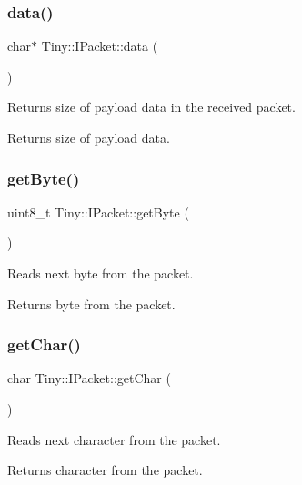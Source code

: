 \subsubsection{\texorpdfstring{data()}{data()}}
{\footnotesize\ttfamily char$\ast$ Tiny\+::\+I\+Packet\+::data (\begin{DoxyParamCaption}{ }\end{DoxyParamCaption})\hspace{0.3cm}{\ttfamily [inline]}}

Returns size of payload data in the received packet. \begin{DoxyReturn}{Returns}
size of payload data. 
\end{DoxyReturn}
\mbox{\label{classTiny_1_1IPacket_ac3088a86a37df4d08d0f6ca961abf006}} 
\subsubsection{\texorpdfstring{get\+Byte()}{getByte()}}
{\footnotesize\ttfamily uint8\+\_\+t Tiny\+::\+I\+Packet\+::get\+Byte (\begin{DoxyParamCaption}{ }\end{DoxyParamCaption})\hspace{0.3cm}{\ttfamily [inline]}}

Reads next byte from the packet. \begin{DoxyReturn}{Returns}
byte from the packet. 
\end{DoxyReturn}
\mbox{\label{classTiny_1_1IPacket_a0fea05a806c533be32c68bb3899bd596}} 
\subsubsection{\texorpdfstring{get\+Char()}{getChar()}}
{\footnotesize\ttfamily char Tiny\+::\+I\+Packet\+::get\+Char (\begin{DoxyParamCaption}{ }\end{DoxyParamCaption})\hspace{0.3cm}{\ttfamily [inline]}}

Reads next character from the packet. \begin{DoxyReturn}{Returns}
character from the packet. 
\end{DoxyReturn}
\mbox{\label{classTiny_1_1IPacket_a9fd3b560b1f34e5d4c3e4a856bddc293}} 
